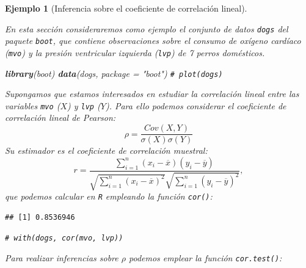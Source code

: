 \documentclass[
]{book}
\newenvironment{Shaded}{\begin{snugshade}}{\end{snugshade}}
\newcommand{\AttributeTok}[1]{\textcolor[rgb]{0.13,0.29,0.53}{#1}}
\newcommand{\CommentTok}[1]{\textcolor[rgb]{0.56,0.35,0.01}{\textit{#1}}}
\newcommand{\FunctionTok}[1]{\textcolor[rgb]{0.13,0.29,0.53}{\textbf{#1}}}
\newcommand{\NormalTok}[1]{#1}
\newcommand{\SpecialCharTok}[1]{\textcolor[rgb]{0.81,0.36,0.00}{\textbf{#1}}}
\newcommand{\StringTok}[1]{\textcolor[rgb]{0.31,0.60,0.02}{#1}}
\theoremstyle{break}
\newtheorem{example}{Ejemplo}[chapter]
\theoremstyle{nonumberplain}
\renewcommand{\CommentTok}[1]{\textcolor[rgb]{0.41,0.41,0.41}{\texttt{#1}}}
\begin{document}
\begin{example}[Inferencia sobre el coeficiente de correlación lineal]
\protect\hypertarget{exm:perm-test-cor}{}\label{exm:perm-test-cor}

En esta sección consideraremos como ejemplo el conjunto de datos \texttt{dogs}
del paquete \texttt{boot}, que contiene observaciones sobre el consumo de
oxígeno cardíaco (\texttt{mvo}) y la presión ventricular izquierda (\texttt{lvp})
de 7 perros domésticos.

\begin{Shaded}
\begin{Highlighting}[]
\FunctionTok{library}\NormalTok{(boot)}
\FunctionTok{data}\NormalTok{(}\StringTok{\textquotesingle{}dogs\textquotesingle{}}\NormalTok{, }\AttributeTok{package =} \StringTok{"boot"}\NormalTok{)}
\CommentTok{\# plot(dogs)}
\end{Highlighting}
\end{Shaded}

Supongamos que estamos interesados en estudiar la correlación lineal
entre las variables \texttt{mvo} (\(X\)) y \texttt{lvp} (\(Y\)).
Para ello podemos considerar el coeficiente de correlación lineal de Pearson:
\[\rho =\frac{ Cov \left( X, Y \right) }
{ \sigma \left( X \right) \sigma \left( Y \right) }\]
Su estimador es el coeficiente de correlación muestral:
\[r=\frac{\sum_{i=1}^{n}(x_i-\overline{x})(y_i-\overline{y})}
{\sqrt{ \sum_{i=1}^{n}(x_i-\overline{x})^{2}} 
\sqrt{\sum_{i=1}^{n}(y_i-\overline{y})^{2}}},\]
que podemos calcular en \texttt{R} empleando la función \texttt{cor()}:

\begin{Shaded}
\end{Shaded}

\begin{verbatim}
## [1] 0.8536946
\end{verbatim}

\begin{Shaded}
\begin{Highlighting}[]
\CommentTok{\# with(dogs, cor(mvo, lvp))}
\end{Highlighting}
\end{Shaded}

Para realizar inferencias sobre \(\rho\) podemos emplear la función
\texttt{cor.test()}:


\end{example}
\end{document}
